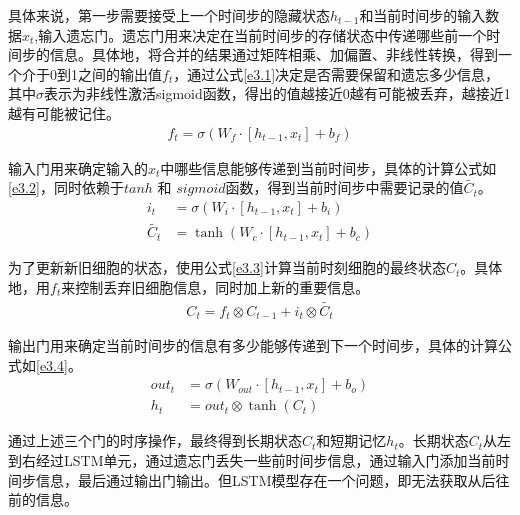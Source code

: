 具体来说，第一步需要接受上一个时间步的隐藏状态$h_{t-1}$和当前时间步的输入数据$x_{t}$,输入遗忘门。遗忘门用来决定在当前时间步的存储状态中传递哪些前一个时间步的信息。具体地，将合并的结果通过矩阵相乘、加偏置、非线性转换，得到一个介于0到1之间的输出值$f_{t}$，通过公式\ref{e3.1}决定是否需要保留和遗忘多少信息，其中$\sigma$表示为非线性激活sigmoid函数，得出的值越接近0越有可能被丢弃，越接近1越有可能被记住。
\begin{equation}\label{e3.1}
  \begin{split}
    f_{t} = \sigma \left(W_{f} \cdot \left[h_{t-1},x_{t}\right] + b_f \right)
  \end{split}
\end{equation}

输入门用来确定输入的$x_{t}$中哪些信息能够传递到当前时间步，具体的计算公式如\ref{e3.2}，同时依赖于$tanh$ 和 $sigmoid$函数，得到当前时间步中需要记录的值$\widetilde{C_t}$。
\begin{equation}\label{e3.2}
  \begin{split}
    i_t &= \sigma \left(W_{i} \cdot \left[h_{t-1},x_{t}\right] + b_i\right)
    \\
    \widetilde{C_t} &= \tanh \left(W_{c} \cdot \left[h_{t-1},x_{t}\right] + b_c \right)
  \end{split}
\end{equation}

为了更新新旧细胞的状态，使用公式\ref{e3.3}计算当前时刻细胞的最终状态$C_t$。具体地，用$f_{t}$来控制丢弃旧细胞信息，同时加上新的重要信息。
\begin{equation}\label{e3.3}
  \begin{split}
   C_t = f_t \otimes C_{t-1} + i_t \otimes \widetilde{C_t}
  \end{split}
\end{equation}

输出门用来确定当前时间步的信息有多少能够传递到下一个时间步，具体的计算公式如\ref{e3.4}。
\begin{equation}\label{e3.4}
  \begin{split}
   out_t &= \sigma \left(W_{out} \cdot \left[h_{t-1},x_{t}\right] + b_o \right)
   \\
   h_t &= out_t \otimes \tanh \left(C_t\right)
  \end{split}
\end{equation}

通过上述三个门的时序操作，最终得到长期状态$C_t$和短期记忆$h_t$。长期状态$C_t$从左到右经过LSTM单元，通过遗忘门丢失一些前时间步信息，通过输入门添加当前时间步信息，最后通过输出门输出。但LSTM模型存在一个问题，即无法获取从后往前的信息。

